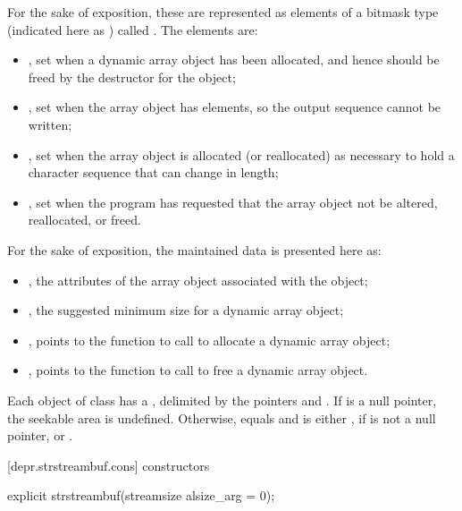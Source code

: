 \pnum
\begin{note}
For the sake of exposition, these are represented as elements of a bitmask type
(indicated here as ) called .
The elements are:
\begin{itemize}
\item
{}, set when a dynamic array object has been
allocated, and hence should be freed by the destructor for the
 object;
\item
{}, set when the array object has
 elements, so the output sequence cannot be written;
\item
{}, set when the array object is allocated
(or reallocated)
as necessary to hold a character sequence that can change in length;
\item
{}, set when the program has requested that the
array object not be altered, reallocated, or freed.
\end{itemize}
\end{note}

\pnum
\begin{note}
For the sake of exposition, the maintained data is presented here as:
\begin{itemize}
\item
{}, the attributes of the array object
associated with the  object;
\item
{}, the suggested minimum size for a
dynamic array object;
\item
{}, points to the function
to call to allocate a dynamic array object;
\item
{}, points to the function to
call to free a dynamic array object.
\end{itemize}
\end{note}

\pnum
Each object of class
has a
,
delimited by the pointers  and .
If  is a null pointer, the seekable area is undefined.
Otherwise,  equals  and
 is either ,
if  is not a null pointer, or .

[depr.strstreambuf.cons]{ constructors}

%
\begin{itemdecl}
explicit strstreambuf(streamsize alsize_arg = 0);
\end{itemdecl}

